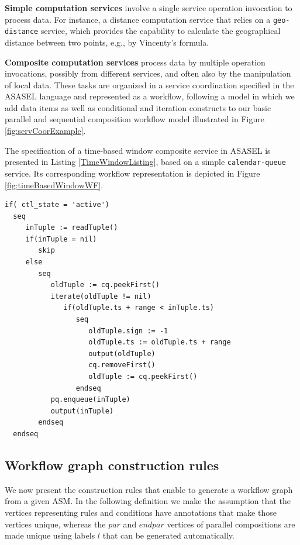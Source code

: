 \textbf{Simple computation services}  involve a single service operation invocation to process data. For instance, a distance computation service that relies on a \texttt{geo-distance} service, which provides the capability to calculate the geographical distance between two points, e.g., by Vincenty's formula.

\textbf{Composite computation services}  process data by multiple operation invocations, possibly from different services, and often also by the manipulation of local data. These tasks are organized in a service coordination specified in the ASASEL language and represented as a workflow, following a model in which we add data items as well as conditional and iteration constructs to our basic parallel and sequential composition workflow model illustrated in Figure \ref{fig:servCoorExample}.
		
The specification of a time-based window composite service in ASASEL is presented in Listing \ref{TimeWindowListing}, based on a simple \texttt{calendar-queue} service. Its corresponding workflow representation is depicted in Figure \ref{fig:timeBasedWindowWF}.
		
\lstset{language=AbStM,showstringspaces=false}
\begin{lstlisting}[caption={ASM specification for the time-based window},label=TimeWindowListing]
if( ctl_state = 'active')
  seq
     inTuple := readTuple()
     if(inTuple = nil)
        skip
     else
        seq
           oldTuple := cq.peekFirst()
           iterate(oldTuple != nil)
              if(oldTuple.ts + range < inTuple.ts)
                 seq
                    oldTuple.sign := -1
                    oldTuple.ts := oldTuple.ts + range
                    output(oldTuple)
                    cq.removeFirst()
                    oldTuple := cq.peekFirst()
                 endseq
           pq.enqueue(inTuple)
           output(inTuple)
        endseq
  endseq
\end{lstlisting}

\subsection{Workflow graph construction rules}

We now present the construction rules that enable to generate a workflow graph from a given ASM. In the following definition we make the assumption that the vertices representing rules and conditions have annotations that make those vertices unique, whereas the $par$ and $endpar$ vertices of parallel compositions are made unique using labels $l$ that can be generated automatically.

